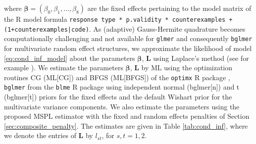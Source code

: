 \documentclass[11pt, a4paper]{article}
\newcommand*{\bb}{\boldsymbol}
\theoremstyle{example} \newtheorem{example}{Example}[section]
\theoremstyle{theorem} \newtheorem{theorem}{Theorem}[section]
\def\bbeta{\bb{\beta}}
\def\bL{\bb{L}}
\begin{document}
where $\bbeta = (\beta_0,\beta_1,\ldots,\beta_8)$ are the fixed effects pertaining to the model matrix of the R model formula \texttt{response \raisebox{-0.9ex}{\~{}} type * p.validity * counterexamples + (1+counterexamples|code)}. As (adaptive) Gauss-Hermite quadrature becomes computationally challenging and not available for \texttt{glmer} and consequently \texttt{bglmer} for multivariate random effect structures, we approximate the likelihood of model \eqref{eq:cond_inf_model} about the parameters $\bbeta$, $\bL$ using Laplace's method (see for example \cite{pinheiro+bates:1995}). We estimate the parameters $\bbeta$, $\bL$ by ML using the optimization routines CG (ML[CG]) and BFGS (ML[BFGS]) of the \texttt{optimx} R package \citep{nash:2014}, \texttt{bglmer} from the \texttt{blme} R package \cite{chung+etal:2013} using independent normal (bglmer[n]) and t (bglmer[t]) priors for the fixed effects and the default Wishart prior for the multivariate variance components. We also estimate the parameters using the proposed MSPL estimator with the fixed and random effects penalties of Section \ref{sec:composite_penalty}. The estimates are given in Table \ref{tab:cond_inf}, where we denote the entries of $\bL$ by $l_{st}$, for $s,t=1,2$. 
\end{document}
